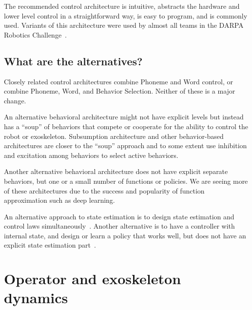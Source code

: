 \documentclass[letterpaper,12pt,fullpage]{article}
\begin{document}
The recommended control architecture is intuitive, abstracts the hardware 
and lower level control in a straightforward way, is easy to program, and is
commonly used. Variants of this architecture were used by almost all teams
in the DARPA Robotics Challenge~\cite{}.

\subsection{What are the alternatives?}

Closely related control architectures combine Phoneme and Word control,
or combine Phoneme, Word, and Behavior Selection.
Neither of these is a major change.

An alternative behavioral architecture might not have explicit levels but instead
has a ``soup'' of behaviors that compete or cooperate for the ability to
control the robot or exoskeleton. Subsumption architecture and other behavior-based
architectures are closer to the ``soup'' approach and to some extent
use inhibition and excitation
among behaviors to select active behaviors.

Another alternative behavioral architecture does not have explicit separate behaviors,
but one or a small number of functions or policies. 
We are seeing more of these architectures
due to the success and popularity of function approximation such as
deep learning.

An alternative approach to state estimation is to design state estimation
and control laws simultaneously~\cite{LQG-LTR}. Another alternative is
to have a controller with internal state, and design or learn a policy
that works well, but does not have an explicit state estimation 
part~\cite{lead-lag}.

\section{Operator and exoskeleton dynamics}
\end{document}
